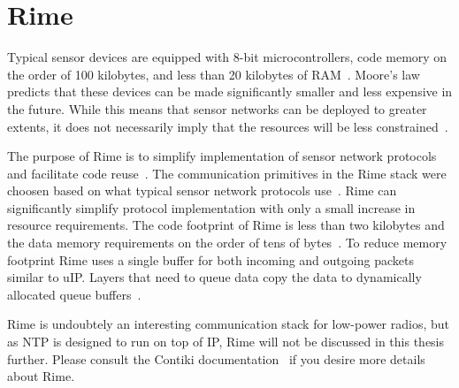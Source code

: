 
\section{Rime}\label{sec:contiki-rime}
Typical sensor devices are equipped with 8-bit microcontrollers,
code memory on the order of 100 kilobytes, and less than
20 kilobytes of RAM~\cite{paper-contiki}.
Moore's law predicts that these devices
can be made significantly smaller and less expensive
in the future. While this means that sensor networks can
be deployed to greater extents, it does not necessarily imply
that the resources will be less constrained~\cite{paper-contiki}.

The purpose of Rime is to simplify implementation of
sensor network protocols and facilitate code reuse~\cite{paper-rime}. 
The communication primitives in the Rime stack were choosen
based on what typical sensor network protocols use~\cite{contiki-docs}.
Rime can significantly simplify protocol implementation
with only a small increase in resource requirements.
The code footprint of Rime is less than two kilobytes and the
data memory requirements on the order of tens of bytes~\cite{paper-rime}.
To reduce memory footprint Rime uses a single buffer for
both incoming and outgoing packets similar to uIP. Layers
that need to queue data copy the data to dynamically
allocated queue buffers~\cite{paper-rime}.

Rime is undoubtely an interesting communication stack for low-power radios,
but as NTP is designed to run on top of IP, Rime will not be discussed
in this thesis further.
Please consult the Contiki documentation~\cite{contiki-docs} if you desire
more details about Rime.
